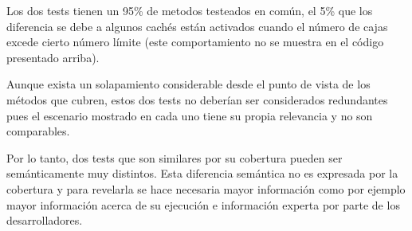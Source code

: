 \par Los dos tests tienen un 95\% de metodos testeados en común, el 5\% que los diferencia se debe a algunos cachés están activados cuando el número de cajas excede cierto número límite (este comportamiento no se muestra en el código presentado arriba). 

\par Aunque exista un solapamiento considerable desde el punto de vista de los métodos que cubren, estos dos tests no deberían ser considerados redundantes pues el escenario mostrado en cada uno tiene su propia relevancia y no son comparables. 

\par Por lo tanto, dos tests que son similares por su cobertura pueden ser semánticamente muy distintos. Esta diferencia semántica no es expresada por la cobertura y para revelarla se hace necesaria mayor información como por ejemplo mayor información acerca de su ejecución e información experta por parte de los desarrolladores. 